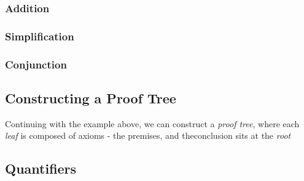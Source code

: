 \documentclass[english,course]{Notes}
\newcommand{\ita}[1]{\textit{#1}}
\begin{document}
\subsubsection{Addition}

\begin{minipage}{.5\textwidth}
\end{minipage}

\subsubsection{Simplification}

\begin{minipage}{.5\textwidth}
\end{minipage}

\subsubsection{Conjunction}

\begin{minipage}{.5\textwidth}
\end{minipage}


\subsection{Constructing a Proof Tree}

\par{Continuing with the example above, we can construct a \ita{proof tree}, where each \ita{leaf} is composed of axioms - the premises, and theconclusion sits at the \ita{root}}


\subsection{Quantifiers}





\newpage



\todos
\end{document}
